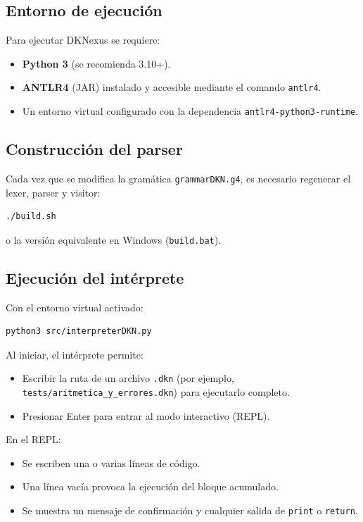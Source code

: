 \documentclass[stu, 12pt, letterpaper, donotrepeattitle, floatsintext, natbib]{apa7}
\begin{document}
\subsection{Entorno de ejecución}
Para ejecutar DKNexus se requiere:
\begin{itemize}
  \item \textbf{Python 3} (se recomienda 3.10+).
  \item \textbf{ANTLR4} (JAR) instalado y accesible mediante el comando \texttt{antlr4}.
  \item Un entorno virtual configurado con la dependencia \texttt{antlr4-python3-runtime}.
\end{itemize}

\subsection{Construcción del parser}
Cada vez que se modifica la gramática \texttt{grammarDKN.g4}, es necesario regenerar el lexer, parser y visitor:

\begin{verbatim}
./build.sh
\end{verbatim}

o la versión equivalente en Windows (\texttt{build.bat}).

\subsection{Ejecución del intérprete}
Con el entorno virtual activado:

\begin{verbatim}
python3 src/interpreterDKN.py
\end{verbatim}

Al iniciar, el intérprete permite:
\begin{itemize}
  \item Escribir la ruta de un archivo \texttt{.dkn} (por ejemplo, \texttt{tests/aritmetica\_y\_errores.dkn}) para ejecutarlo completo.
  \item Presionar Enter para entrar al modo interactivo (REPL).
\end{itemize}

En el REPL:
\begin{itemize}
  \item Se escriben una o varias líneas de código.
  \item Una línea vacía provoca la ejecución del bloque acumulado.
  \item Se muestra un mensaje de confirmación y cualquier salida de \texttt{print} o \texttt{return}.
\end{itemize}
\end{document}
